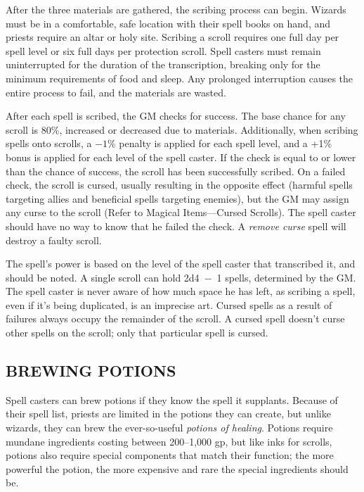 \begin{multicols}{2}
After the three materials are gathered, the scribing process can begin.  Wizards must be in a comfortable, safe location with their spell books on hand, and priests require an altar or holy site.  Scribing a scroll requires one full day per spell level or six full days per protection scroll.  Spell casters must remain uninterrupted for the duration of the transcription, breaking only for the minimum requirements of food and sleep.  Any prolonged interruption causes the entire process to fail, and the materials are wasted.
 
After each spell is scribed, the GM checks for success.  The base chance for any scroll is 80\%, increased or decreased due to materials.  Additionally, when scribing spells onto scrolls, a $-1$\% penalty is applied for each spell level, and a +1\% bonus is applied for each level of the spell caster.  If the check is equal to or lower than the chance of success, the scroll has been successfully scribed.  On a failed check, the scroll is cursed, usually resulting in the opposite effect (harmful spells targeting allies and beneficial spells targeting enemies), but the GM may assign any curse to the scroll (Refer to Magical Items---Cursed Scrolls).  The spell caster should have no way to know that he failed the check.  A \textit{remove curse} spell will destroy a faulty scroll.
 
The spell's power is based on the level of the spell caster that transcribed it, and should be noted.  A single scroll can hold 2d4~$-$~1 spells, determined by the GM.  The spell caster is never aware of how much space he has left, as scribing a spell, even if it's being duplicated, is an imprecise art.  Cursed spells as a result of failures always occupy the remainder of the scroll.  A cursed spell doesn't curse other spells on the scroll; only that particular spell is cursed.
 
\subsection{BREWING POTIONS}

Spell casters can brew potions if they know the spell it supplants.  Because of their spell list, priests are limited in the potions they can create, but unlike wizards, they can brew the ever-so-useful \textit{potions of healing}.  Potions require mundane ingredients costing between 200--1,000 gp, but like inks for scrolls, potions also require special components that match their function; the more powerful the potion, the more expensive and rare the special ingredients should be.
 

\end{multicols}
